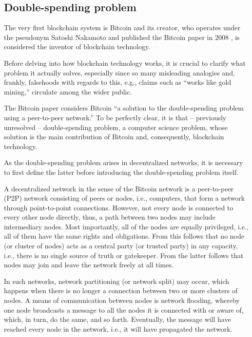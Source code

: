 \subsection{Double-spending problem}

The very first blockchain system is Bitcoin and its creator, who operates under the pseudonym Satoshi Nakamoto and published the Bitcoin paper in 2008 \autocite{bitcoin2008paper}, is considered the inventor of blockchain technology.

Before delving into how blockchain technology works, it is crucial to clarify what problem it actually solves, especially since so many misleading analogies and, frankly, falsehoods with regards to this, e.g., claims such as ``works like gold mining,'' circulate among the wider public.

The Bitcoin paper considers Bitcoin ``a solution to the double-spending problem using a peer-to-peer network.'' \autocite[1]{bitcoin2008paper}
To be perfectly clear, it is that -- previously unresolved -- double-spending problem, a computer science problem, whose solution is the main contribution of Bitcoin and, consequently, blockchain technology.

As the double-spending problem arises in decentralized networks, it is necessary to first define the latter before introducing the double-spending problem itself.

A decentralized network in the sense of the Bitcoin network is a peer-to-peer (P2P) network consisting of peers or nodes, i.e., computers, that form a network through point-to-point connections.
However, not every node is connected to every other node directly, thus, a path between two nodes may include intermediary nodes.
Most importantly, all of the nodes are equally privileged, i.e., all of them have the same rights and obligations.
From this follows that no node (or cluster of nodes) acts as a central party (or trusted party) in any capacity, i.e., there is no single source of truth or gatekeeper.
From the latter follows that nodes may join and leave the network freely at all times.

In such networks, network partitioning (or network split) may occur, which happens when there is no longer a connection between two or more clusters of nodes.
A means of communication between nodes is network flooding, whereby one node broadcasts a message to all the nodes it is connected with or aware of, which, in turn, do the same, and so forth.
Eventually, the message will have reached every node in the network, i.e., it will have propagated the network.

